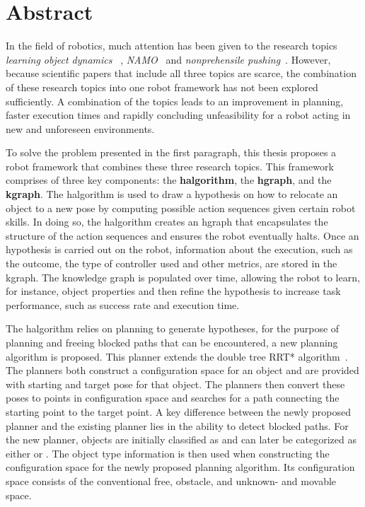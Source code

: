 \chapter*{Abstract}
In the field of robotics, much attention has been given to the research topics \textit{learning object dynamics}~\cite{cong_selfadapting_2020,seegmiller_vehicle_2013}
, \textit{\acf{NAMO}}~\cite{chen_fast_2018,elbanhawi_samplingbased_2014,kingston_samplingbased_2018,lavalle_planning_2006} and \textit{nonprehensile pushing}~\cite{arruda_uncertainty_2017,bauza_dataefficient_2018,mericli_pushmanipulation_2015,stuber_featurebased_2018,stuber_let_2020,toussaint_sequenceofconstraints_2022}. However, because scientific papers that include all three topics are scarce, the combination of these research topics into one robot framework has not been explored sufficiently. A combination of the topics leads to an improvement in planning, faster execution times and rapidly concluding unfeasibility for a robot acting in new and unforeseen environments.\bs

To solve the problem presented in the first paragraph, this thesis proposes a robot framework that combines these three research topics. This framework comprises of three key components: the \textbf{\acl{halgorithm}}, the \textbf{\acl{hgraph}}, and the \textbf{\acl{kgraph}}. The \acl{halgorithm} is used to draw a hypothesis on how to relocate an object to a new pose by computing possible action sequences given certain robot skills. In doing so, the \acl{halgorithm} creates an \acl{hgraph} that encapsulates the structure of the action sequences and ensures the robot eventually halts. Once an hypothesis is carried out on the robot, information about the execution, such as the outcome, the type of controller used and other metrics, are stored in the \acl{kgraph}. The knowledge graph is populated over time, allowing the robot to learn, for instance, object properties and then refine the hypothesis to increase task performance, such as success rate and execution time.\bs

The \acl{halgorithm} relies on planning to generate hypotheses, for the purpose of planning and freeing blocked paths that can be encountered, a new planning algorithm is proposed. This planner extends the double tree \acl{RRT*} algorithm~\cite{chen_fast_2018}. The planners both construct a configuration space for an object and are provided with starting and target pose for that object. The planners then convert these poses to points in configuration space and searches for a path connecting the starting point to the target point. A key difference between the newly proposed planner and the existing planner lies in the ability to detect blocked paths. For the new planner, objects are initially classified as  and can later be categorized as either  or . The object type information is then used when constructing the configuration space for the newly proposed planning algorithm. Its configuration space consists of the conventional free, obstacle, and unknown- and movable space.\bs

